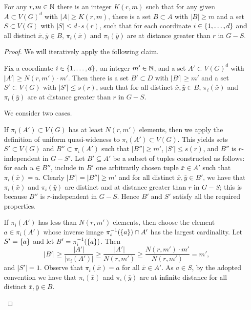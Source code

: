 \begin{lemma}\label{lem:step1} For any $r,m\in \mathbb{N}$ there is an integer $K(r,m)$ such that
	for any given $A\subset V(G)^d$ with $|A|\ge K(r,m)$,
	there is a set $B\subset A$ with $|B|\ge m$ and a set $S\subset V(G)$ with $|S|\le d\cdot s(r)$, 
	such that for each coordinate $i\in\{1,\ldots,d\}$ and all distinct $\bar x,\bar y\in B$,
 $\pi_i(\bar x)$ and $\pi_i(\bar y)$ are at distance greater than $r$ in $G-S$. 
\end{lemma}
\begin{proof}
We will iteratively apply the following claim.


\begin{claim}\label{claim:ith-coord}
Fix a coordinate $i\in\{1,\ldots,d\}$, an integer $m'\in\mathbb{N}$, and a  set $A'\subset V(G)^d$ with  $|A'|\ge N(r,m')\cdot m'$.
Then there is a set $B'\subset D$ with $|B'|\ge m'$
and a set $S'\subset V(G)$ with $|S'|\le  s(r)$, such that for all distinct $\bar x,\bar y\in B$,
 $\pi_i(\bar x)$ and $\pi_i(\bar y)$ are at distance greater than $r$ in $G-S$. 
\end{claim}
\begin{clproof}
We consider two cases.

If $\pi_i(A')\subset V(G)$ has at least $N(r,m')$ elements, then we apply the definition of uniform quasi-wideness to $\pi_i(A')\subset V(G)$. This yields sets $S'\subset V(G)$ and $B''\subset \pi_i(A')$
such that $|B''|\ge m'$, $|S'|\le s(r)$, and $B''$ is $r$-independent in $G-S'$. 
Let $B'\subseteq A'$ be a subset of tuples constructed as follows: for each $u\in B''$, include in $B'$ one arbitrarily chosen tuple $\bar x\in A'$ such that $\pi_i(\bar x)=u$.
Clearly $|B'|=|B''|\ge m'$ and for all distinct $\bar x,\bar y\in B'$, we have that $\pi_i(\bar x)$ and $\pi_i(\bar y)$ are distinct and at distance greater than $r$ in $G-S$; this is because $B''$ is $r$-independent
in $G-S$. Hence $B'$ and $S'$ satisfy all the required properties.

If $\pi_i(A')$ has less than $N(r,m')$ elements, then choose the element $a\in\pi_i(A')$ whose inverse image $\pi_i^{-1}(\{a\})\cap A'$ has the largest cardinality. Let $S'=\{a\}$ 
and let $B'=\pi_i^{-1}(\{a\})$. Then $$|B'|\ge \frac{|A'|}{|\pi_i(A')|}\ge \frac{|A'|}{N(r,m')}\ge \frac {N(r,m')\cdot m'}{N(r,m')}=m',$$
and $|S'|=1$. Observe that $\pi_i(\bar x)=a$ for all $\bar x\in A'$. As $a\in S$, by the adopted convention we have that $\pi_i(\bar x)$ and $\pi_i(\bar y)$ are at infinite distance for all distinct $\bar x,\bar y\in B$.
\end{clproof}


\end{proof}
